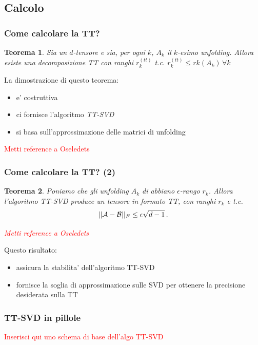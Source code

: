 \documentclass{beamer}
\newcommand{\nota}[1]{\textcolor{red}{#1}}
\theoremstyle{definition}
\theoremstyle{plain}
\newtheorem{teorema}{Teorema}
\begin{document}
\subsection{Calcolo}
\begin{frame}
\frametitle{Come calcolare la TT?}
\begin{teorema}
Sia \A un $d$-tensore e sia, per ogni $k$, $A_k$ il $k$-esimo unfolding.
Allora esiste una decomposizione TT con ranghi $r_k^{(tt)}$ t.c. $r_k^{(tt)} \leq rk(A_k) \, \forall k$
\end{teorema}

\vspace{5mm}
La dimostrazione di questo teorema:
\begin{itemize}
	\item e' costruttiva
	\item ci fornisce l'algoritmo \emph{TT-SVD}
	\item si basa sull'approssimazione delle matrici di unfolding
\end{itemize}

\nota{Metti reference a Oseledets}
\end{frame}

\begin{frame}
\frametitle{Come calcolare la TT? (2)}
\begin{teorema}
Poniamo che gli unfolding $A_k$ di \A abbiano $\epsilon$-rango $r_k$.
Allora l'algoritmo TT-SVD produce un tensore \B in formato TT, con ranghi $r_k$ e t.c. 
\begin{equation*}
    ||\mathcal{A} - \mathcal{B} ||_F \le \epsilon \sqrt{d-1}\, .
\end{equation*}

\nota{Metti reference a Oseledets}
\end{teorema}

\vspace{5mm}
Questo risultato:
\begin{itemize}
	\item assicura la stabilita' dell'algoritmo TT-SVD
	\item fornisce la soglia di approssimazione sulle SVD per ottenere la precisione desiderata sulla TT
\end{itemize}
\end{frame}

\begin{frame}
\frametitle{TT-SVD in pillole}
\nota{Inserisci qui uno schema di base dell'algo TT-SVD}
\end{frame}
\end{document}
